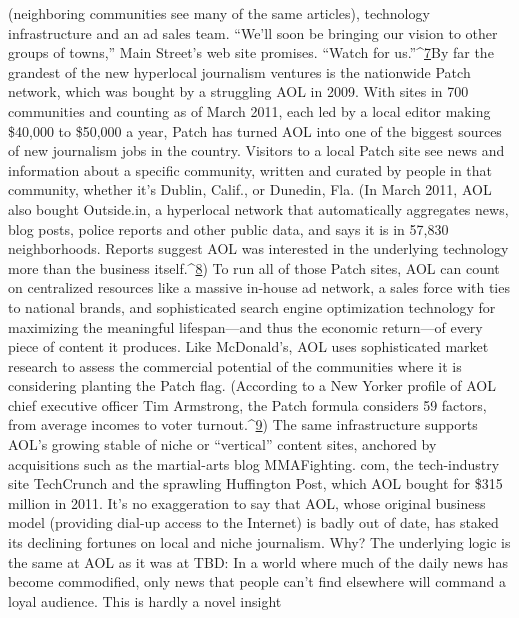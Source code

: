 (neighboring communities see many of the same articles), technology infrastructure
and an ad sales team. ``We'll soon be bringing our vision to other groups of
towns,'' Main Street's web site promises. ``Watch for us.''^{\href{#endnotes-chapter-3}{7}}By far the grandest of the new hyperlocal journalism ventures is the nationwide
Patch network, which was bought by a struggling AOL in 2009. With sites
in 700 communities and counting as of March 2011, each led by a local editor
making \$40,000 to \$50,000 a year, Patch has turned AOL into one of the biggest
sources of new journalism jobs in the country. Visitors to a local Patch site
see news and information about a specific community, written and curated by
people in that community, whether it's Dublin, Calif., or Dunedin, Fla. (In March
2011, AOL also bought Outside.in, a hyperlocal network that automatically aggregates
news, blog posts, police reports and other public data, and says it is in
57,830 neighborhoods. Reports suggest AOL was interested in the underlying
technology more than the business itself.^{\href{#endnotes-chapter-3}{8}})
To run all of those Patch sites, AOL can count on centralized resources like
a massive in-house ad network, a sales force with ties to national brands, and
sophisticated search engine optimization technology for maximizing the meaningful
lifespan—and thus the economic return—of every piece of content it
produces. Like McDonald's, AOL uses sophisticated market research to assess the
commercial potential of the communities where it is considering planting the
Patch flag. (According to a New Yorker profile of AOL chief executive officer
Tim Armstrong, the Patch formula considers 59 factors, from average incomes
to voter turnout.^{\href{#endnotes-chapter-3}{9}})
The same infrastructure supports AOL's growing stable of niche or ``vertical''
content sites, anchored by acquisitions such as the martial-arts blog MMAFighting.
com, the tech-industry site TechCrunch and the sprawling Huffington Post,
which AOL bought for \$315 million in 2011. It's no exaggeration to say that
AOL, whose original business model (providing dial-up access to the Internet) is
badly out of date, has staked its declining fortunes on local and niche journalism.
Why? The underlying logic is the same at AOL as it was at TBD: In a world
where much of the daily news has become commodified, only news that people
can't find elsewhere will command a loyal audience. This is hardly a novel insight
